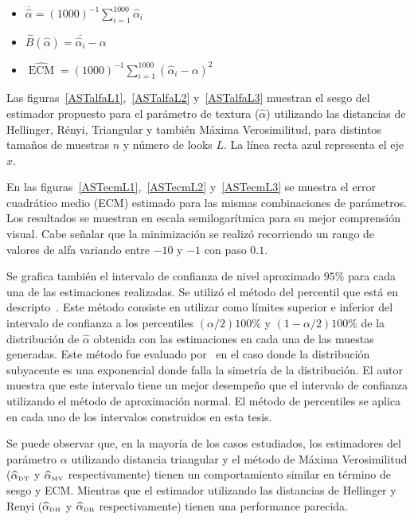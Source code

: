 \begin{itemize}
	\item $\overline{\widehat{\alpha}}=(1000)^{-1}{\sum_{i=1}^{1000}{\widehat{\alpha}_i}}$
	\item $\widehat{B}(\widehat\alpha) = \overline{\widehat\alpha_i}- \alpha$
	\item $\widehat{\operatorname{\text{ECM}}}=({1000})^{-1}{\sum_{i=1}^{1000}{(\widehat{\alpha}_i-\alpha)^2}}$
\end{itemize}


Las figuras~\ref{ASTalfaL1},~\ref{ASTalfaL2} y~\ref{ASTalfaL3} muestran el sesgo del estimador propuesto para el parámetro de textura ($\widehat{\alpha}$) utilizando las distancias de Hellinger, Rényi, Triangular y también Máxima Verosimilitud, para distintos tamaños de muestras $n$ y número de looks $L$. 
La línea recta azul representa el eje $x$. 

En las figuras~\ref{ASTecmL1},~\ref{ASTecmL2} y~\ref{ASTecmL3} se muestra el error cuadrático medio (ECM) estimado para las mismas combinaciones de parámetros. Los resultados se muestran en escala semilogarítmica para su mejor comprensión visual.
Cabe señalar que la minimización se realizó recorriendo un rango de valores de alfa variando entre $-10$ y $-1$ con paso  $0.1$. 

Se grafica también el intervalo de confianza de nivel aproximado $95\%$ para cada una de las estimaciones realizadas. Se utilizó el método del percentil que está en descripto~\cite{Buckland1983}. Este método consiste en utilizar como límites superior e inferior del intervalo de confianza a los percentiles $(\alpha/2) 100\%$ y $(1-\alpha/2) 100\%$ de la distribución de $\widehat{\alpha}$ obtenida con las estimaciones en cada una de las muestas generadas. Este método fue evaluado por~\cite{Buckland1983} en el caso donde la distribución subyacente es una exponencial donde falla la simetría de la distribución. El autor muestra que este intervalo tiene un mejor desempeño que el intervalo de confianza utilizando el método de aproximación normal. El método de percentiles se aplica en cada uno de los intervalos construidos en esta tesis.

 Se puede observar que, en la mayoría de los casos estudiados, los estimadores del parámetro $\alpha$ utilizando distancia triangular y el método de Máxima Verosimilitud ($\widehat{\alpha}_{\text{\tiny{DT}}}$ y $\widehat{\alpha}_{\text{\tiny{MV}}}$ respectivamente) tienen un comportamiento similar en término de sesgo y ECM. Mientras que  el estimador utilizando las distancias de Hellinger y Renyi ($\widehat{\alpha}_{\text{\tiny{DH}}}$ y $\widehat{\alpha}_{\text{\tiny{DR}}}$ respectivamente) tienen una performance parecida. 
 
